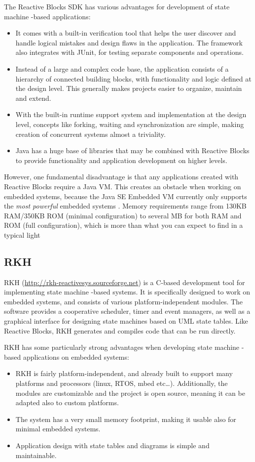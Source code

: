 The Reactive Blocks SDK has various advantages for development of state machine -based applications:
\begin{itemize}
	\item It comes with a built-in verification tool that helps the user discover and handle logical mistakes and design flaws in the application. The framework also integrates with JUnit, for testing separate components and operations.
	\item Instead of a large and complex code base, the application consists of a hierarchy of connected building blocks, with functionality and logic defined at the design level. This generally makes projects easier to organize, maintain and extend.
	\item With the built-in runtime support system and implementation at the design level, concepts like forking, waiting and synchronization are simple, making creation of concurrent systems almost a triviality.
	\item Java has a huge base of libraries that may be combined with Reactive Blocks to provide functionality and application development on higher levels.
\end{itemize}

However, one fundamental disadvantage is that any applications created with Reactive Blocks require a Java VM. This creates an obstacle when working on embedded systems, because the Java SE Embedded VM currently only supports the \textit{most powerful} embedded systems \cite{website:java_embedded_vm}. Memory requirements range from 130KB RAM/350KB ROM (minimal configuration) to several MB for both RAM and ROM (full configuration), which is more than what you can expect to find in a typical light

\subsection{RKH}
RKH (\url{http://rkh-reactivesys.sourceforge.net}) is a C-based development tool for implementing state machine -based systems. It is specifically designed to work on embedded systems, and consists of various platform-independent modules. The software provides a cooperative scheduler, timer and event managers, as well as a graphical interface for designing state machines based on UML state tables. Like Reactive Blocks, RKH generates and compiles code that can be run directly.

RKH has some particularly strong advantages when developing state machine -based applications on embedded systems:
\begin{itemize}
\item RKH is fairly platform-independent, and already built to support many platforms and processors (linux, RTOS, mbed etc…). Additionally, the modules are customizable and the project is open source, meaning it can be adapted also to custom platforms.
\item The system has a very small memory footprint, making it usable also for minimal embedded systems.
\item Application design with state tables and diagrams is simple and maintainable.
\end{itemize}

